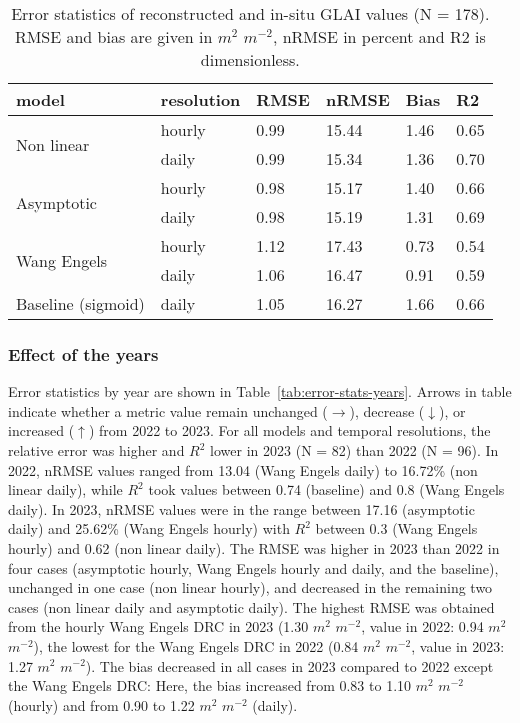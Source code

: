 \begin{table}[H]
\caption{Error statistics of reconstructed and in-situ \gls{GLAI} values (N = 178). \gls{RMSE} and bias are given in $m^2$ $m^{-2}$, \gls{nRMSE} in percent and \gls{R2} is dimensionless.}
\label{tab:error-stats}
\centering
\begin{tabular}{@{}llllll@{}}
\toprule
model                        & resolution & \gls{RMSE}          & \gls{nRMSE}         & Bias          & \gls{R2}            \\ \midrule
\multirow{2}{*}{Non linear} & hourly      & 0.99          &  15.44 & 1.46          & 0.65          \\
                             & daily       & 0.99          & 15.34 & 1.36          & 0.70 \\
\multirow{2}{*}{Asymptotic}  & hourly      & 0.98 & 15.17 & 1.40          & 0.66          \\
                             & daily       & 0.98 & 15.19 & 1.31          & 0.69          \\
\multirow{2}{*}{Wang Engels}  & hourly      & 1.12          & 17.43          & 0.73 & 0.54          \\
                             & daily       & 1.06          & 16.47          & 0.91          & 0.59          \\
Baseline (sigmoid)                      & daily       & 1.05          & 16.27          & 1.66          & 0.66          \\ \bottomrule
\end{tabular}
\end{table}

\subsubsection{Effect of the years}
Error statistics by year are shown in Table~\ref{tab:error-stats-years}. Arrows in table indicate whether a metric value remain unchanged ($\rightarrow$), decrease ($\downarrow$), or increased ($\uparrow$) from 2022 to 2023. For all models and temporal resolutions, the relative error was higher and $R^2$ lower in 2023 (N = 82) than 2022 (N = 96). In 2022, nRMSE values ranged from 13.04 (Wang Engels daily) to 16.72\% (non linear daily), while $R^2$ took values between 0.74 (baseline) and 0.8 (Wang Engels daily). In 2023, nRMSE values were in the range between 17.16 (asymptotic daily) and 25.62\% (Wang Engels hourly) with $R^2$ between 0.3 (Wang Engels hourly) and 0.62 (non linear daily). The RMSE was higher in 2023 than 2022 in four cases (asymptotic hourly, Wang Engels hourly and daily, and the baseline), unchanged in one case (non linear hourly), and decreased in the remaining two cases (non linear daily and asymptotic daily). The highest RMSE was obtained from the hourly Wang Engels \gls{DRC} in 2023 (1.30 $m^2$ $m^{-2}$, value in 2022: 0.94 $m^2$ $m^{-2}$), the lowest for the Wang Engels \gls{DRC} in 2022 (0.84 $m^2$ $m^{-2}$, value in 2023: 1.27 $m^2$ $m^{-2}$). The bias decreased in all cases in 2023 compared to 2022 except the Wang Engels \gls{DRC}: Here, the bias increased from 0.83 to 1.10 $m^2$ $m^{-2}$ (hourly) and from 0.90 to 1.22 $m^2$ $m^{-2}$ (daily).

